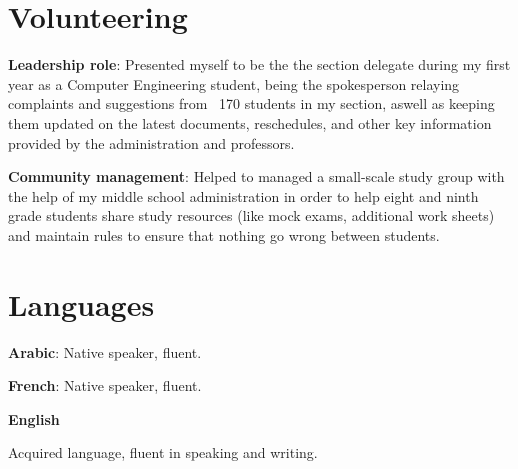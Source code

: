 \documentclass[10pt, letterpaper]{article}
\begin{document}

\newpage

\section{Volunteering}

\begin{onecolentry}
    \textbf{Leadership role}: Presented myself to be the the section delegate during my first year
    as a Computer Engineering student, being the spokesperson relaying complaints and suggestions from ~170
    students in my section, aswell as keeping them updated on the latest documents, reschedules, and other
    key information provided by the administration and professors.

    \vspace{0.10cm}

    \textbf{Community management}: Helped to managed a small-scale study group with the help of my
    middle school administration in order to help eight and ninth grade students share study resources
    (like mock exams, additional work sheets) and maintain rules to ensure that nothing go wrong between
    students.
\end{onecolentry}



\section{Languages}


\vspace{0.05cm}

\begin{onecolentry}
    \textbf{Arabic}: Native speaker, fluent.
\end{onecolentry}

\vspace{0.05cm}

\begin{onecolentry}
    \textbf{French}: Native speaker, fluent.
\end{onecolentry}

\begin{onecolentry}
    \textbf{English}
\end{onecolentry}
\begin{onecolentry}
    \begin{highlights}
    \item Acquired language, fluent in speaking and writing.
    \item {}
    \end{highlights}
\end{onecolentry}
\end{document}
